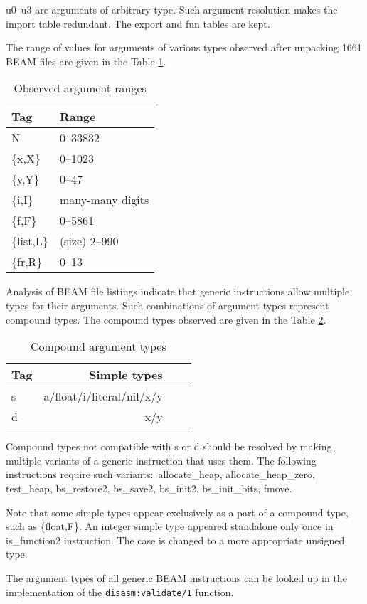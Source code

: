 \documentclass{article}
\begin{document}
u0--u3 are arguments of arbitrary type. Such argument resolution makes the
import table redundant. The export and fun tables are kept.

The range of values for arguments of various types observed after unpacking 1661
BEAM files are given in the Table \ref{tab:genranges}.

\begin{table}[!ht]
\begin{tabular}{ll}
Tag & Range \\
\hline
N & 0--33832 \\
\{x,X\} & 0--1023 \\
\{y,Y\} & 0--47 \\
\{i,I\} & many-many digits \\
\{f,F\} & 0--5861 \\
\{list,L\} & (size) 2--990 \\
\{fr,R\} & 0--13 \\
\hline
\end{tabular}
\caption{Observed argument ranges\label{tab:genranges}}
\end{table}

Analysis of BEAM file listings indicate that generic instructions allow multiple
types for their arguments. Such combinations of argument types represent
compound types. The compound types observed are given in the Table
\ref{tab:comptypes}.

\begin{table}[!ht]
\begin{tabular}{lrll}
Tag & Simple types\\
\hline
s & a/float/i/literal/nil/x/y \\
d & x/y \\
\hline
\end{tabular}
\caption{Compound argument types\label{tab:comptypes}}
\end{table}

Compound types not compatible with s or d should be resolved by making multiple
variants of a generic instruction that uses them. The following instructions
require such variants$:$ allocate\_heap, allocate\_heap\_zero, test\_heap,
bs\_restore2, bs\_save2, bs\_init2, bs\_init\_bits, fmove.

Note that some simple types appear exclusively as a part of a compound type,
such as \{float,F\}. An integer simple type appeared standalone only once in
is\_function2 instruction. The case is changed to a more appropriate unsigned
type.

The argument types of all generic BEAM instructions can be looked up in the
implementation of the \verb$disasm:validate/1$ function.
\end{document}

